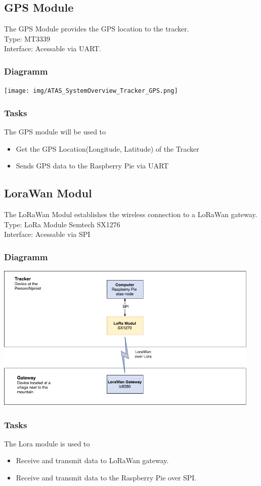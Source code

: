\documentclass[a4paper,11pt, oneside]{report}
\theoremstyle{definition}
\begin{document}
\subsection{GPS Module}
The GPS Module provides the GPS location to the tracker.\\[0.3cm]
Type: MT3339\\
Interface:  Acessable via UART.
\subsubsection{Diagramm}
\texttt{[image: img/ATAS\_SystemOverview\_Tracker\_GPS.png]}
\subsubsection{Tasks}
The GPS module will be used to
\begin{itemize}
\item Get the GPS Location(Longitude, Latitude) of the Tracker
\item Sends GPS data to the Raspberry Pie via UART
\end{itemize}


\subsection{LoraWan Modul}
The LoRaWan Modul establishes the wireless connection to a LoRaWan gateway.\\[0.3cm]
Type: LoRa Module Semtech SX1276\\
Interface: Acessable via SPI
\subsubsection{Diagramm}
\includegraphics[width=0.95\textwidth]{img/ATAS_SystemOverview_Detail_LoRaWan.png}

\subsubsection{Tasks}
The Lora module is used to
\begin{itemize}
\item Receive and transmit data to LoRaWan gateway.
\item Receive and transmit data to the Raspberry Pie over SPI.
\end{itemize}
\end{document}
